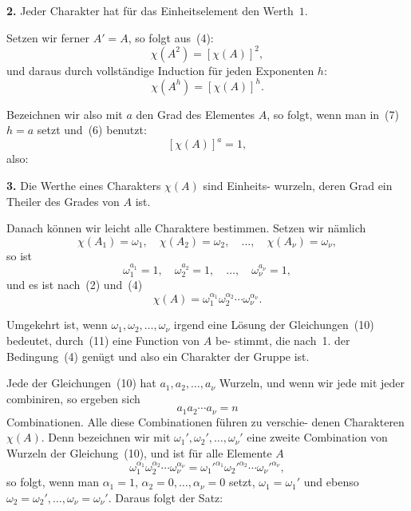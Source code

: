 \documentclass[12pt,a4paper]{article}
\theoremstyle{plain}
\theoremstyle{definition}
\theoremstyle{remark}
\begin{document}
\textbf{2.} Jeder Charakter hat für das Einheitselement den
Werth~$1$.

Setzen wir ferner $A' = A$, so folgt aus~(4):
\[
\chi(A^2) = [\chi(A)]^2,
\]
und daraus durch vollständige Induction für jeden Exponenten $h$:
\begin{equation}\tag{7}
\chi(A^h) = [\chi(A)]^h.
\end{equation}

Bezeichnen wir also mit $a$ den Grad des Elementes $A$, so
folgt, wenn man in~(7) $h = a$ setzt und~(6) benutzt:
\begin{equation}\tag{8}
[\chi(A)]^a = 1,
\end{equation}
also:

\textbf{3.} Die Werthe eines Charakters $\chi(A)$ sind Einheits-
wurzeln, deren Grad ein Theiler des Grades
von $A$ ist.

Danach können wir leicht alle Charaktere bestimmen. Setzen
wir nämlich
\begin{equation}\tag{9}
\chi(A_1) = \omega_1, \quad \chi(A_2) = \omega_2, \quad \ldots, \quad \chi(A_\nu) = \omega_\nu,
\end{equation}
so ist
\begin{equation}\tag{10}
\omega_1^{a_1} = 1, \quad \omega_2^{a_2} = 1, \quad \ldots, \quad \omega_\nu^{a_\nu} = 1,
\end{equation}
und es ist nach~(2) und~(4)
\begin{equation}\tag{11}
\chi(A) = \omega_1^{\alpha_1} \omega_2^{\alpha_2} \cdots \omega_\nu^{\alpha_\nu}.
\end{equation}

Umgekehrt ist, wenn $\omega_1, \omega_2, \ldots, \omega_\nu$ irgend eine Lösung der
Gleichungen~(10) bedeutet, durch~(11) eine Function von $A$ be-
stimmt, die nach~1. der Bedingung~(4) genügt und also ein
Charakter der Gruppe ist.

Jede der Gleichungen~(10) hat $a_1, a_2, \ldots, a_\nu$ Wurzeln, und
wenn wir jede mit jeder combiniren, so ergeben sich
\[
a_1 a_2 \cdots a_\nu = n
\]
Combinationen. Alle diese Combinationen führen zu verschie-
denen Charakteren $\chi(A)$. Denn bezeichnen wir mit $\omega_1', \omega_2', \ldots, \omega_\nu'$
eine zweite Combination von Wurzeln der Gleichung~(10), und
ist für alle Elemente $A$
\[
\omega_1^{\alpha_1} \omega_2^{\alpha_2} \cdots \omega_\nu^{\alpha_\nu} = \omega_1'^{\alpha_1} \omega_2'^{\alpha_2} \cdots \omega_\nu'^{\alpha_\nu},
\]
so folgt, wenn man $\alpha_1 = 1$, $\alpha_2 = 0, \ldots, \alpha_\nu = 0$ setzt, $\omega_1 = \omega_1'$
und ebenso $\omega_2 = \omega_2', \ldots, \omega_\nu = \omega_\nu'$. Daraus folgt der Satz:
\end{document}
